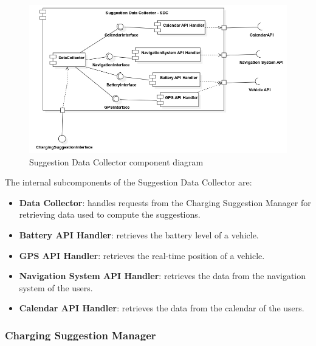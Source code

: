 \documentclass{Configuration_Files/PoliMi3i_thesis}
\begin{document}
\begin{figure}[H]
    \centering
    \includegraphics[width=1\textwidth]{Images/component/Suggestion Data Collector.jpg}
    \caption{Suggestion Data Collector component diagram}
\end{figure}

The internal subcomponents of the Suggestion Data Collector are:
\begin{itemize}
    \item \textbf{Data Collector}: handles requests from the Charging Suggestion Manager for retrieving data used to compute the suggestions.
    \item \textbf{Battery API Handler}: retrieves the battery level of a vehicle.
    \item \textbf{GPS API Handler}: retrieves the real-time position of a vehicle.
    \item \textbf{Navigation System API Handler}: retrieves the data from the navigation system of the users.
    \item \textbf{Calendar API Handler}: retrieves the data from the calendar of the users.
\end{itemize}

\subsubsection{Charging Suggestion Manager}
\end{document}
